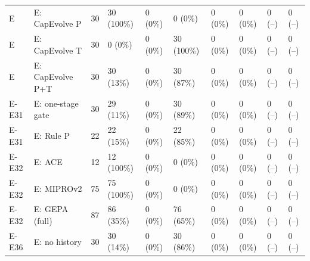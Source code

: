 \begin{table}[t]
\begin{tabular}{@{}llrlllllll@{}}
E & E: CapEvolve P & 30 & 30 (100\%) & 0 (0\%) & 0 (0\%) & 0 (0\%) & 0 (0\%) & 0 (--) & 0 (--) \\
E & E: CapEvolve T & 30 & 0 (0\%) & 0 (0\%) & 30 (100\%) & 0 (0\%) & 0 (0\%) & 0 (--) & 0 (--) \\
E & E: CapEvolve P+T & 30 & 30 (13\%) & 0 (0\%) & 30 (87\%) & 0 (0\%) & 0 (0\%) & 0 (--) & 0 (--) \\
E-E31 & E: one-stage gate & 30 & 29 (11\%) & 0 (0\%) & 30 (89\%) & 0 (0\%) & 0 (0\%) & 0 (--) & 0 (--) \\
E-E31 & E: Rule P & 22 & 22 (15\%) & 0 (0\%) & 22 (85\%) & 0 (0\%) & 0 (0\%) & 0 (--) & 0 (--) \\
E-E32 & E: ACE & 12 & 12 (100\%) & 0 (0\%) & 0 (0\%) & 0 (0\%) & 0 (0\%) & 0 (--) & 0 (--) \\
E-E32 & E: MIPROv2 & 75 & 75 (100\%) & 0 (0\%) & 0 (0\%) & 0 (0\%) & 0 (0\%) & 0 (--) & 0 (--) \\
E-E32 & E: GEPA (full) & 87 & 86 (35\%) & 0 (0\%) & 76 (65\%) & 0 (0\%) & 0 (0\%) & 0 (--) & 0 (--) \\
E-E36 & E: no history & 30 & 30 (14\%) & 0 (0\%) & 30 (86\%) & 0 (0\%) & 0 (0\%) & 0 (--) & 0 (--) \\
\bottomrule
\end{tabular}
\end{table}
